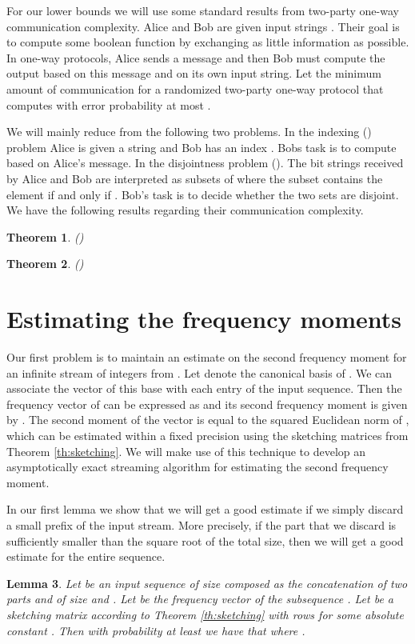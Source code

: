 \documentclass[a4paper,11pt,oneside,english,onecolumn]{article}
\newtheorem{theorem}{Theorem}
\newtheorem{lemma}[theorem]{Lemma}
\theoremstyle{definition}
\begin{document}
For our lower bounds we will use some standard results from two-party one-way communication complexity. Alice and Bob are given input strings . Their goal is to compute some boolean function  by exchanging as little information as possible. In one-way protocols, Alice sends a message and then Bob must compute the output based on this message and on its own input string. Let  the minimum amount of communication for a randomized two-party one-way protocol that computes  with error probability at most .

We will mainly reduce from the following two problems. In the indexing () problem Alice is given a string  and Bob has an index . Bobs task is to compute  based on Alice's message. In the disjointness problem (). The bit strings  received by Alice and Bob are interpreted as subsets of  where the subset  contains the element  if and only if . Bob's task is to decide whether the two sets are disjoint. We have the following results regarding their communication complexity.

\begin{theorem}(\cite{Disjointness})
\label{th:disjointness}

\end{theorem}

\begin{theorem}(\cite{CommComplexity})
\label{th:indexing}

\end{theorem}



\section{Estimating the frequency moments}
\label{section:F2}

Our first problem is to maintain an estimate on the second frequency moment for an infinite stream  of integers from . Let  denote the canonical basis of . We can associate the vector  of this base with each entry  of the input sequence. Then the frequency vector of  can be expressed as  and its second frequency moment is given by . The second moment of the vector  is equal to the squared Euclidean norm of , which can be estimated within a fixed precision using the sketching matrices from Theorem \ref{th:sketching}. We will make use of this technique to develop an asymptotically exact streaming algorithm for estimating the second frequency moment.

In our first lemma we show that we will get a good estimate if we simply discard a small prefix of the input stream. More precisely, if the part that we discard is sufficiently smaller than the square root of the total size, then we will get a good estimate for the entire sequence.
\begin{lemma}
\label{lemma:F2}
Let  be an input sequence of size  composed as the concatenation of two parts  and  of size  and . Let  be the frequency vector of the subsequence . Let  be a sketching matrix according to Theorem \ref{th:sketching} with  rows for some absolute constant . Then with probability at least  we have that  where .
\end{lemma}
\end{document}
